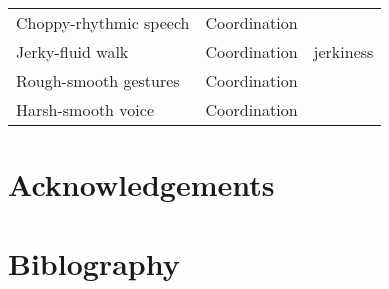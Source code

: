 \documentclass[smallextended]{svjour3}
\begin{document}
\begin{table}[h]
\begin{tabular}{|l |c|  l |}
		Choppy-rhythmic speech & Coordination\\
		Jerky-fluid walk & Coordination & jerkiness\\
		Rough-smooth gestures & Coordination\\
		Harsh-smooth voice & Coordination\\ \hline
		
	\end{tabular}
	
\end{table} 




\section{Acknowledgements}


\section{Biblography}

\end{document}
